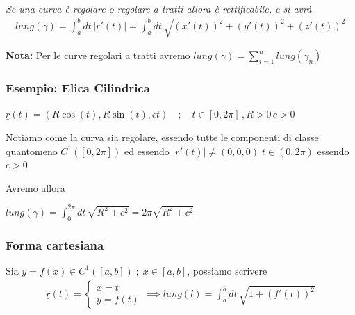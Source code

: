 \bigskip

\textit{Se una curva è regolare o regolare a tratti allora è rettificabile, e si avrà}
\begin{align}
lung(\gamma)=\int_{a}^{b} dt \, |r'(t)|= \int_{a}^{b} dt \, \sqrt{(x'(t))^2 + (y'(t))^2 + (z'(t))^2}
\end{align}

\textbf{Nota:} Per le curve regolari a tratti avremo $lung(\gamma)=\sum_{i=1}^{n}lung(\gamma_n)$

\bigskip

\subsubsection{Esempio: Elica Cilindrica}

$\underline{r}(t)=(R\cos(t), R\sin(t), ct) \quad; \quad t\in[0,2\pi] \, , R>0 \, c>0$

Notiamo come la curva sia regolare, essendo tutte le componenti di classe quantomeno $C^1([0,2\pi])$ ed essendo $|r'(t)|\neq (0,0,0) \; t\in(0,2\pi)$ essendo $c>0$

Avremo allora 
\bigskip

$lung(\gamma)=\int_{0}^{2\pi} dt \, \sqrt{R^2 + c^2}= 2\pi\sqrt{R^2 + c^2}$

\subsubsection{Forma cartesiana}

Sia $y=f(x)\in C^1([a,b]) \; ; \; x\in[a,b]$, possiamo scrivere
\begin{align}
\underline{r}(t)=\left\{
\begin{array}{cc}
x=t \quad \;\,\\
y=f(t)
\end{array}
\right. \implies
lung(l)= \int_{a}^{b} dt \, \sqrt{1+ (f'(t))^2}
\end{align}

